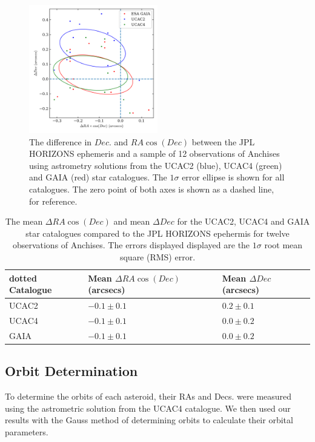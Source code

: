 \documentclass[10pt, twocolumn]{revtex4}    %
\begin{document}
\begin{figure}[h!]
\centering
\includegraphics[width=0.5\textwidth]{20180424_174110_ASTROM_COMPARE}
\caption{The difference in $Dec.$ and $RA\cos(Dec)$ between the JPL HORIZONS ephemeris and a sample of 12 observations of Anchises using astrometry solutions from the UCAC2 (blue), UCAC4 (green) and GAIA (red) star catalogues. The $1\sigma$ error ellipse is shown for all catalogues. The zero point of both axes is shown as a dashed line, for reference.}
\label{fig: astrom compare}
\end{figure}

\begin{table}[h!]
\centering
\begin{tabularx}{0.5\textwidth}{ Y Y Y }
\hhline{===}dotted
Catalogue & Mean $\Delta RA \cos (Dec)$ (arcsecs) & Mean $\Delta Dec$ (arcsecs) \\[3pt] \hline
UCAC2 & $-0.1 \pm 0.1$ & $0.2 \pm 0.1$ \\[3pt]
UCAC4 & $-0.1 \pm 0.1$ & $0.0 \pm 0.2$ \\[3pt]
GAIA & $-0.1 \pm 0.1$ & $0.0 \pm 0.2$ \\[3pt] \hline
\end{tabularx}
\caption{The mean $\Delta RA \cos (Dec)$ and mean $\Delta Dec$ for the UCAC2, UCAC4 and GAIA star catalogues compared to the JPL HORIZONS epehermis for twelve observations of Anchises. The errors displayed displayed are the $1\sigma$ root mean square (RMS) error.}
\label{tab: astrom compare results}
\end{table}


\subsection*{Orbit Determination}

To determine the orbits of each asteroid, their RAs and Decs. were measured using the astrometric solution from the UCAC4 catalogue. We then used our results with the Gauss method of determining orbits to calculate their orbital parameters.
\end{document}
